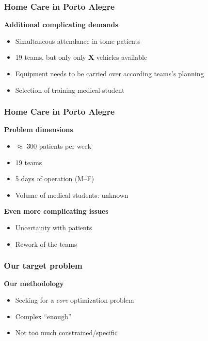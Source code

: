 \begin{frame}
   \frametitle{Home Care in Porto Alegre}

   \textbf{Additional complicating demands}
   \begin{itemize}
      \item Simultaneous attendance in some patients
      \item 19 teams, but only only \textcolor{InfRed}{\bfseries X} vehicles available
      \item Equipment needs to be carried over according teams's planning
      \item Selection of training medical student
   \end{itemize}

\end{frame}

\begin{frame}
   \frametitle{Home Care in Porto Alegre}

   \textbf{Problem dimensions}
   \begin{itemize}
      \item $\approx$ 300 patients per week
      \item 19 teams
      \item 5 days of operation (M--F)
      \item Volume of medical students: unknown
   \end{itemize}

   \vspace*{12pt}

   \textbf{Even more complicating issues}
   \begin{itemize}
      \item Uncertainty with patients
      \item Rework of the teams
   \end{itemize}

\end{frame}

\begin{frame}
   \frametitle{Our target problem}

   \textbf{Our methodology}
   \begin{itemize}
      \item Seeking for a \emph{core} optimization problem
      \item Complex ``enough''
      \item Not too much constrained/specific
   \end{itemize}

\end{frame}

